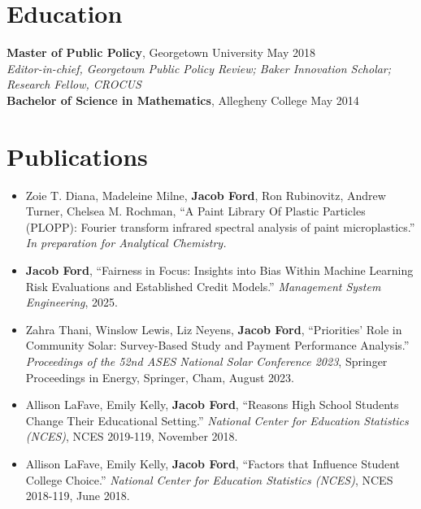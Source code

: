 \documentclass[11pt]{article}
\begin{document}
\section{Education}
\textbf{Master of Public Policy}, Georgetown University \hfill May 2018\\
\textit{Editor-in-chief, Georgetown Public Policy Review; Baker Innovation Scholar; Research Fellow, CROCUS}\\[3pt]
\textbf{Bachelor of Science in Mathematics}, Allegheny College \hfill May 2014

\section{Publications}
\begin{itemize}
  \item Zoie T. Diana, Madeleine Milne, \textbf{Jacob Ford}, Ron Rubinovitz, Andrew Turner, Chelsea M. Rochman, ``A Paint Library Of Plastic Particles (PLOPP): Fourier transform infrared spectral analysis of paint microplastics.'' \textit{In preparation for Analytical Chemistry.}
  \item \textbf{Jacob Ford}, ``Fairness in Focus: Insights into Bias Within Machine Learning Risk Evaluations and Established Credit Models.'' \textit{Management System Engineering}, 2025.
  \item Zahra Thani, Winslow Lewis, Liz Neyens, \textbf{Jacob Ford}, ``Priorities' Role in Community Solar: Survey-Based Study and Payment Performance Analysis.'' \textit{Proceedings of the 52nd ASES National Solar Conference 2023}, Springer Proceedings in Energy, Springer, Cham, August 2023.
  \item Allison LaFave, Emily Kelly, \textbf{Jacob Ford}, ``Reasons High School Students Change Their Educational Setting.'' \textit{National Center for Education Statistics (NCES)}, NCES 2019-119, November 2018.
  \item Allison LaFave, Emily Kelly, \textbf{Jacob Ford}, ``Factors that Influence Student College Choice.'' \textit{National Center for Education Statistics (NCES)}, NCES 2018-119, June 2018.
\end{itemize}
\end{document}
